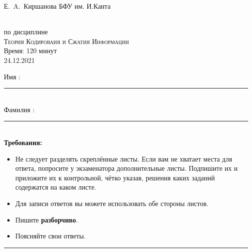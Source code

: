 \documentclass[12pt,a4paper]{scrartcl}
\newcounter{auf}
\begin{document}
Е.\ A.\ Киршанова \hfill БФУ им. И.Канта \\





\begin{center}
  \LARGE
  \\[1ex]
  \Large
  по дисциплине \\[1ex]
  \textsc{Теория Кодироваия и Сжатия Информации}\\[2ex]
  \large
  Время: 120 минут \\
 24.12.2021
\end{center}
\vspace*{1.5cm}


Имя   :\\[-2.2ex] \rule{0.9\textwidth}{.2pt}\\[2ex]
Фамилия : \\ [-2.2ex] \rule{0.9\textwidth}{.2pt}\\[1ex]

\vspace*{1.5cm}
\textbf{Требования:}
\begin{itemize}
  \item Не следует разделять скреплённые листы.  Если вам не хватает места для ответа, попросите у экзаменатора дополнительные листы. Подпишите их и приложите их к контрольной, чётко указав, решения каких заданий содержатся на каком листе.
 \item Для записи ответов вы можете использовать обе стороны листов.
  \item Пишите \textbf{разборчиво}.
  \item Поясняйте свои ответы.
    
    
  
\end{itemize}

\rule{\textwidth}{.2pt}
\vfill
\end{document}
